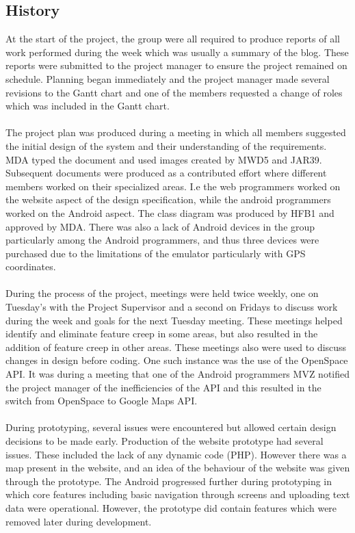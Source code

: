 \documentclass[12pt, portrait]{article}
\begin{document}
\subsection{History}
At the start of the project, the group were all required to produce reports of all work performed during the week which was usually a summary of the blog. These reports were submitted to the project manager to ensure the project remained on schedule. Planning began immediately and the project manager made several revisions to the Gantt chart and one of the members requested a change of roles which was included in the Gantt chart. 
\\\\
The project plan was produced during a meeting in which all members suggested the initial design of the system and their understanding of the requirements. MDA typed the document and used images created by MWD5 and JAR39. Subsequent documents were produced as a contributed effort where different members worked on their specialized areas. I.e the web programmers worked on the website aspect of the design specification, while the android programmers worked on the Android aspect. The class diagram was produced by HFB1 and approved by MDA. There was also a lack of Android devices in the group particularly among the Android programmers, and thus three devices were purchased due to the limitations of the emulator particularly with GPS coordinates.
\\\\
During the process of the project, meetings were held twice weekly, one on Tuesday’s with the Project Supervisor and a second on Fridays to discuss work during the week and goals for the next Tuesday meeting. These meetings helped identify and eliminate feature creep in some areas, but also resulted in the addition of feature creep in other areas. These meetings also were used to discuss changes in design before coding. One such instance was the use of the OpenSpace API. It was during a meeting that one of the Android programmers MVZ notified the project manager of the inefficiencies of the API and this resulted in the switch from OpenSpace to Google Maps API.
\\\\
During prototyping, several issues were encountered but allowed certain design decisions to be made early. Production of the website prototype had several issues. These included the lack of any dynamic code (PHP). However there was a map present in the website, and an idea of the behaviour of the website was given through the prototype. The Android progressed further during prototyping in which core features including basic navigation through screens and uploading text data were operational. However, the prototype did contain features which were removed later during development.
\end{document}

